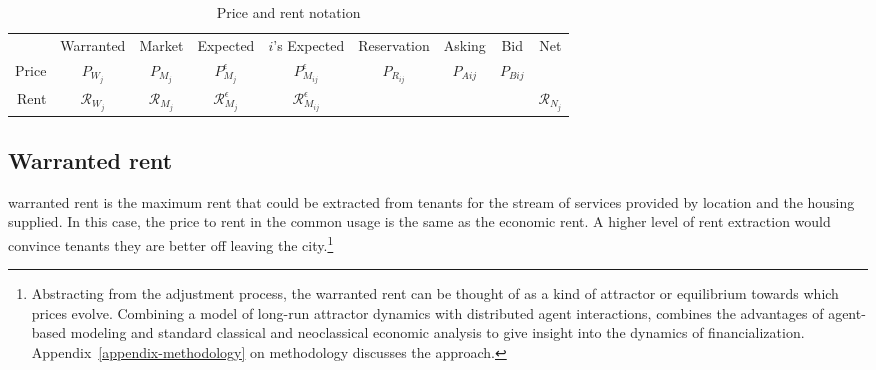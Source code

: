 

\begin{table}[!ht]
\centering
{\renewcommand{\arraystretch}{1.6}
\begin{tabular}{r|c|c|c|c|c|c|c|c|}\cline{2-9}
       & Warranted  & Market & Expected & $i$'s Expected & Reservation & Asking & Bid &Net    \\ \cline{2-9}
Price  & $P_{W_j}$      & $P_{M_j}$  & $P_{M_j}^\epsilon$ & $P_{M_{ij}}^{\epsilon}$     & $P_{R_{ij}}$       & $P_{A{ij}}$  & $P_{B{ij}}$ &  \\ \cline{2-9}
Rent  & $\mathcal{R}_{W_j}$      & $\mathcal{R}_{M_j}$  & $\mathcal{R}_{M_j}^\epsilon$ & $\mathcal{R}_{M_{ij}}^{\epsilon}$     &       &   &  & $\mathcal{R}_{N_j} $\\ \cline{2-9}
\end{tabular}
 }   

\caption{Price and rent notation}
\label{table-price-notation}
\end{table}




\subsection{Warranted rent}\label{sec:warranted-rent}
\Gls{warranted rent} is the maximum rent that could be extracted from tenants for the stream of services provided by location and the housing supplied. In this case, the price to rent in the common usage is the same as the economic rent. A higher level of rent extraction would convince tenants they are better off leaving the city.\footnote{Abstracting from the adjustment process, the warranted rent can be thought of as a kind of \gls{attractor} or \gls{equilibrium} towards which prices evolve.  %
Combining a model of long-run attractor dynamics with distributed agent interactions, combines the advantages of agent-based modeling and standard \gls{classical} and \gls{neoclassical} economic analysis to give insight into the dynamics of financialization. Appendix~\ref{appendix-methodology} on methodology discusses the approach.} 

